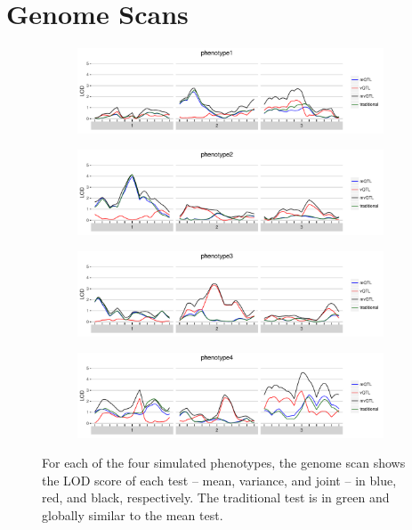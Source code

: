 \documentclass[9pt,twocolumn,twoside]{gsag3jnl}
\begin{document}
\section*{Genome Scans}

\begin{figure}[t]
    \begin{subfigure}[b]{\linewidth}
        \includegraphics[width=\textwidth]{images/LOD_scan_phenotype1.pdf}
    \end{subfigure}
    \begin{subfigure}[b]{\linewidth}
        \includegraphics[width=\textwidth]{images/LOD_scan_phenotype2.pdf}
    \end{subfigure}
    \begin{subfigure}[b]{\linewidth}
        \includegraphics[width=\textwidth]{images/LOD_scan_phenotype3.pdf}
    \end{subfigure}
    \begin{subfigure}[b]{\linewidth}
        \includegraphics[width=\textwidth]{images/LOD_scan_phenotype4.pdf}
    \end{subfigure}
    \caption{For each of the four simulated phenotypes, the genome scan shows the LOD score of each test -- mean, variance, and joint -- in blue, red, and black, respectively.  The traditional test is in green and globally similar to the mean test. \label{fig:lod_score_scans}}
\end{figure}
\end{document}
